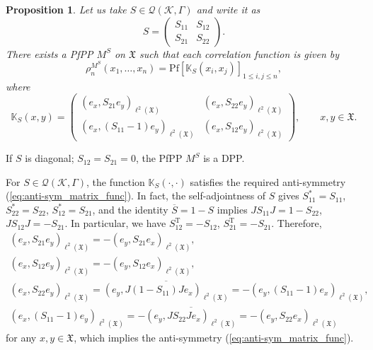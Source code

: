 \documentclass[pdftex]{sigma}
\numberwithin{equation}{section}
\newtheorem{Proposition}[Theorem]{Proposition}
 { \theoremstyle{definition}
\newtheorem{Definition}[Theorem]{Definition}
\newtheorem{Example}[Theorem]{Example}
\newtheorem{Remark}[Theorem]{Remark} }
\newcommand{\mfrak}[1]{\mathfrak{#1}}
\newcommand{\mcal}[1]{\mathcal{#1}}
\newcommand{\mbb}[1]{\mathbb{#1}}
\newcommand{\mrm}[1]{\mathrm{#1}}
\begin{document}
\begin{Proposition}\label{prop:existence_ppp}
Let us take $S\in\mcal{Q}(\mcal{K},\Gamma)$ and write it as
\begin{equation*}
	S=\left(
	\begin{matrix}
		S_{11} & S_{12} \\
		S_{21} & S_{22}
	\end{matrix}
	\right).
\end{equation*}
There exists a PfPP $M^{S}$ on $\mfrak{X}$ such that each correlation function is given by
\begin{equation*}
	\rho^{M^{S}}_{n}(x_{1},\dots, x_{n})=\mrm{Pf} [\mbb{K}_{S}(x_{i},x_{j}) ]_{1\le i,j\le n},
\end{equation*}
where
\begin{equation}
\label{eq:matrix_kernel_S}
	\mbb{K}_{S}(x,y)=\left(
	\begin{matrix}
		(e_{x},S_{21}e_{y})_{\ell^{2}(\mfrak{X})} & (e_{x},S_{22}e_{y})_{\ell^{2}(\mfrak{X})} \\
		(e_{x},(S_{11}-1)e_{y})_{\ell^{2}(\mfrak{X})} & (e_{x},S_{12}e_{y})_{\ell^{2}(\mfrak{X})}
	\end{matrix}
	\right),\qquad x,y\in\mfrak{X}.
\end{equation}
\end{Proposition}

\begin{Remark}
If $S$ is diagonal; $S_{12}=S_{21}=0$, the PfPP $M^{S}$ is a DPP.
\end{Remark}

\begin{Remark}
\label{rem:check_anti-sym_matrix_func}
For $S\in\mcal{Q}(\mcal{K},\Gamma)$, the function $\mbb{K}_{S}(\cdot,\cdot)$ satisfies the required anti-symmetry (\ref{eq:anti-sym_matrix_func}). In fact, the self-adjointness of $S$ gives $S_{11}^{\ast}=S_{11}$, $S_{22}^{\ast}=S_{22}$, $S_{12}^{\ast}=S_{21}$, and the identity $\overline{S}=1-S$ implies $JS_{11}J=1-S_{22}$, $JS_{12}J=-S_{21}$. In particular, we have $S_{12}^{\mrm{T}}=-S_{12}$, $S_{21}^{\mrm{T}}=-S_{21}$. Therefore,
\begin{gather*}
	(e_{x},S_{21}e_{y})_{\ell^{2}(\mfrak{X})} =-(e_{y},S_{21}e_{x})_{\ell^{2}(\mfrak{X})},\\
	(e_{x},S_{12}e_{y})_{\ell^{2}(\mfrak{X})} =-(e_{y},S_{12}e_{x})_{\ell^{2}(\mfrak{X})}, \\
	(e_{x},S_{22}e_{y})_{\ell^{2}(\mfrak{X})} =\overline{(e_{y},J(1-S_{11})Je_{x})_{\ell^{2}(\mfrak{X})}}=-(e_{y},(S_{11}-1)e_{x})_{\ell^{2}(\mfrak{X})}, \\
(e_{x},(S_{11}-1)e_{y})_{\ell^{2}(\mfrak{X})}=-\overline{(e_{y},JS_{22}Je_{x})_{\ell^{2}(\mfrak{X})}}=-(e_{y},S_{22}e_{x})_{\ell^{2}(\mfrak{X})}
\end{gather*}
for any $x,y\in\mfrak{X}$, which implies the anti-symmetry (\ref{eq:anti-sym_matrix_func}).
\end{Remark}
\end{document}
